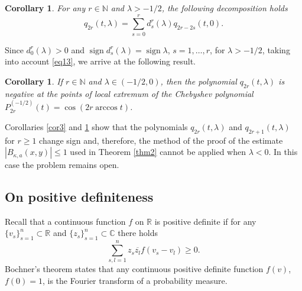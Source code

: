 \documentclass[12pt,twoside,reqno]{amsart}\usepackage[cp1251]{inputenc}
\theoremstyle{plain}
\newtheorem{corollary}[theorem]{Corollary}
\theoremstyle{remark}
\newcommand\sign{\operatorname{sign}}
\begin{document}
\begin{corollary}\label{cor4}
For any  $r\in\mathbb{N}$ and $\lambda>-1/2$, the following decomposition holds
\[
q_{2r}(t,\lambda)=\sum_{s=0}^{r}d_s^r(\lambda)q_{2r-2s}(t,0).%
\]
\end{corollary}

Since $ d_0^r(\lambda)>0$ and  $\sign d_s^r(\lambda)=\sign\lambda$, $s=1,\dots,r$,
for $\lambda>-1/2$, taking into account
\eqref{eq13},
we arrive at the following result.

\begin{corollary}\label{cor5}
If $r\in\mathbb{N}$ and $\lambda\in (-1/2,0)$, then the polynomial
$q_{2r}(t,\lambda)$ is negative at the points of local extremum of the
Chebyshev polynomial $P_{2r}^{(-1/2)}(t)=\cos{}(2r\arccos t)$.
\end{corollary}

Corollaries \ref{cor3} and \ref{cor5} show that   the polynomials
$q_{2r}(t,\lambda)$ and $q_{2r+1}(t,\lambda)$ for $r\ge 1$ change sign  and,
therefore, the method of the proof of the estimate $|B_{\kappa,a}(x,y)|\le 1$
used in Theorem \ref{thm2}  cannot be applied when $\lambda<0$. In this
case the problem remains open.

\subsection{On positive definiteness}\label{subsec3-1}
Recall that a continuous function $f$ on $\mathbb{R}$ is positive definite if for any
 $\{v_s\}_{s=1}^{n}\subset\mathbb{R}$ and $\{z_s\}_{s=1}^{n}\subset\mathbb{C}$
there holds
\[
\sum_{s,l=1}^{n}z_s\overline{z_{l}}f(v_s-v_l)\ge 0.
\]
Bochner's theorem states that any continuous positive definite function $f(v)$, $f(0)=1$, is the Fourier transform of a probability measure.
\end{document}
